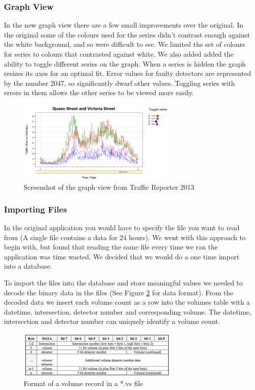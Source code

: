 \documentclass{article}
\begin{document}
\subsubsection{Graph View}
In the new graph view there are a few small improvements over the original. In the original some of the colours used for the series didn't contrast enough against the white background, and so were difficult to see. We limited the set of colours for series to colours that contrasted against white. We also added added the ability to toggle different series on the graph. When a series is hidden the graph resizes its axes for an optimal fit. Error values for faulty detectors are represented by the number 2047, so significantly dwarf other values. Toggling series with errors in them allows the other series to be viewed more easily.

\begin{figure}[!b]
\centerline{\includegraphics[width=3.1in]{newGraph}}
\caption{Screenshot of the graph view from Traffic Reporter 2013}
\label{fig:newGraph}
\end{figure}

\subsubsection{Importing Files}
In the original application you would have to specify the file you want to read from (A single file contains a data for 24 hours). We went with this approach to begin with, but found that reading the same file every time we ran the application was time wasted. We decided that we would do a one time import into a database.

To import the files into the database and store meaningful values we needed to decode the binary data in the files (See Figure \ref{fig:vsDataFormat} for data format). From the decoded data we insert each volume count as a row into the volumes table with a datetime, intersection, detector number and corresponding volume. The datetime, intersection and detector number can uniquely identify a volume count.

\begin{figure}[!t]
\centerline{\includegraphics[width=3.1in]{volumeDataFormat}}
\caption{Format of a volume record in a *.vs file}
\label{fig:vsDataFormat}
\end{figure}
\end{document}
